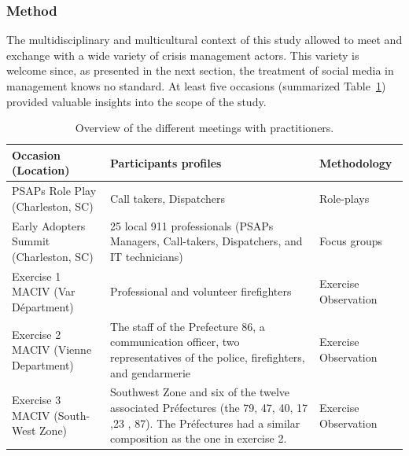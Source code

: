 \subsubsection{Method}
The multidisciplinary and multicultural context of this study allowed to meet and exchange with a wide variety of crisis management actors.
This variety is welcome since, as presented in the next section, the treatment of social media in management knows no standard.
At least five occasions (summarized Table~\ref{table:terrain-summary}) provided valuable insights into the scope of the study.

\begin{table}[hbp]
    \centering
    \caption{Overview of the different meetings with practitioners.}
    \begin{tabular}{m{} m{} m{}}
        Occasion (Location)                    & Participants profiles                                                                                                                                          & Methodology          \\ [0.5ex]
        \toprule
        PSAPs Role Play (Charleston, SC)       & Call takers, Dispatchers                                                                                                                                       & Role-plays           \\
        Early Adopters Summit (Charleston, SC) & 25 local 911 professionals (PSAPs Managers, Call-takers, Dispatchers, and IT technicians)                                                                      & Focus groups         \\
        Exercise 1 MACIV (Var Départment)      & Professional and volunteer firefighters                                                                                                                        & Exercise Observation \\
        Exercise 2 MACIV (Vienne Department)   & The staff of the Prefecture 86, a communication officer, two representatives of the police, firefighters, and gendarmerie                                      & Exercise Observation \\
        Exercise 3 MACIV (South-West Zone)     & Southwest Zone and six of the twelve associated Préfectures (the 79, 47, 40, 17 ,23 , 87). The Préfectures had a similar composition as the one in exercise 2. & Exercise Observation \\
        \bottomrule
    \end{tabular}
    \label{table:terrain-summary}
\end{table}

